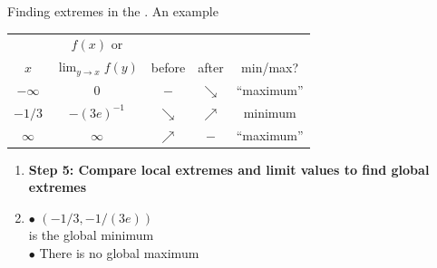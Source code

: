 \documentclass[9pt]{beamer}
\begin{document}
\begin{frame}{Finding  extremes in the . An example}
\begin{minipage}{0.66\textwidth}
\begin{enumerate}[leftmargin = 0.2cm, label = , rightmargin = 0.1cm]
            \begin{table}
            \begin{flushleft}
            \begin{tabular}{c|cccc}
                  & $f(x)$ or  &  &    &\\ 
                $x$     & $\lim_{y\rightarrow x} f(y)$ & before    & after     & min/max? \\ \hline
                $-\infty$    & $0$       & $-$        & $\searrow$  & ``maximum''  \\
                $-1/3$    & $-(3e)^{-1}$      & $\searrow$  & $\nearrow$  & minimum  \\
                $\infty$     & $\infty$      & $\nearrow$  & $-$  & ``maximum''
            \end{tabular}
            \end{flushleft}
            \end{table}
            
            \end{enumerate}
            
        \end{minipage}
        \begin{minipage}{0.31\textwidth}
            \vspace{-0.25cm}
            
            \begin{enumerate}[leftmargin = 0.2cm, label = , rightmargin = 0cm]
            
            \item \textbf{Step 5: Compare local extremes and limit values to find global extremes}

            \item $\bullet$ $(-1/3, -1/(3e))$ \\ 
            is the global minimum \\ 
            $\bullet$ There is no global maximum
        
            \end{enumerate}
            
        \end{minipage}
    
\end{frame}
\end{document}
